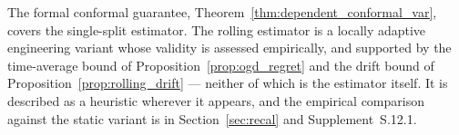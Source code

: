 \begin{remark}
	\label{rem:rolling_status}
	The formal conformal guarantee, Theorem~\ref{thm:dependent_conformal_var},
	covers the single-split estimator. The rolling estimator is a locally
	adaptive engineering variant whose validity is assessed empirically, and
	supported by the time-average bound of Proposition~\ref{prop:ogd_regret} and
	the drift bound of Proposition~\ref{prop:rolling_drift} --- neither of which
	is the estimator itself. It is described as a heuristic wherever it appears,
	and the empirical comparison against the static variant is in
	Section~\ref{sec:recal} and Supplement~S.12.1.
\end{remark}
